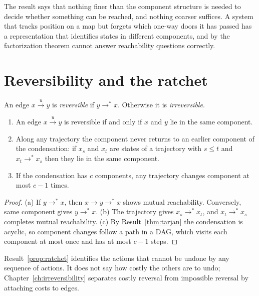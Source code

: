 The result says that nothing finer than the component structure is needed to decide whether something can be reached, and nothing coarser suffices. A system that tracks position on a map but forgets which one-way doors it has passed has a representation that identifies states in different components, and by the factorization theorem cannot answer reachability questions correctly.

\section{Reversibility and the ratchet}

\begin{definition}\label{def:reversible}
An edge $x\xrightarrow{u}y$ is \emph{reversible} if $y\to^{*}x$. Otherwise it is \emph{irreversible}.
\end{definition}

\begin{newresult}\label{prop:ratchet}
\begin{enumerate}[nosep,label=(\alph*)]
  \item An edge $x\xrightarrow{u}y$ is reversible if and only if $x$ and $y$ lie in the same component.
  \item Along any trajectory the component never returns to an earlier component of the condensation: if $x_s$ and $x_t$ are states of a trajectory with $s\le t$ and $x_t\to^{*}x_s$ then they lie in the same component.
  \item If the condensation has $c$ components, any trajectory changes component at most $c-1$ times.
\end{enumerate}
\end{newresult}
\begin{proof}
(a) If $y\to^{*}x$, then $x\to y\to^{*}x$ shows mutual reachability. Conversely, same component gives $y\to^{*}x$. (b) The trajectory gives $x_s\to^{*}x_t$, and $x_t\to^{*}x_s$ completes mutual reachability. (c) By Result~\ref{thm:tarjan} the condensation is acyclic, so component changes follow a path in a DAG, which visits each component at most once and has at most $c-1$ steps.
\end{proof}

Result~\ref{prop:ratchet} identifies the actions that cannot be undone by any sequence of actions. It does not say how costly the others are to undo; Chapter~\ref{ch:irreversibility} separates costly reversal from impossible reversal by attaching costs to edges.

